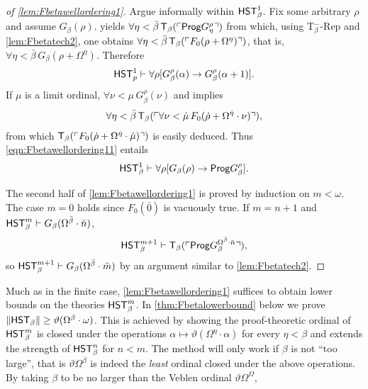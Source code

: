 \documentclass[UKenglish,cleveref,DIV=12]{scrartcl}
\theoremstyle{definition}
\theoremstyle{definition}
\begin{document}
\begin{proof}[of \cref{lem:Fbetawellordering1}]
Argue informally within $\mathsf{HST}_\beta^1$. Fix some arbitrary $\rho$ and assume $G_\beta(\rho)$.
 yields $\forall\eta<\bar\beta\,\mathsf{T}_\beta(\ulcorner{\mathsf{Prog}G_\eta^\rho}\urcorner)$ from which, using T$^-_\beta$-Rep and \cref{lem:Fbetatech2},
one obtains
  $\forall\eta<\bar\beta\,\mathsf{T}_\beta(\ulcorner{F_0(\rho+\Omega^\eta)}\urcorner)$,
that is, $\forall\eta<\bar\beta\,G_\beta(\rho+\Omega^\eta)$. Therefore
\begin{align}\label{eqn:Fbetawellordering11}
 \mathsf{HST}_p^1\vdash\forall\rho[G_\beta^\rho(\alpha)\rightarrow G_\beta^\rho(\alpha+1)].
\end{align}
If $\mu$ is a limit ordinal, $\forall\nu<\mu\,G_\beta^\rho(\nu)$ and
\Uni\beta implies
\begin{align*}
\forall\eta<\bar\beta\,\mathsf{T}_\beta(\ulcorner{\forall\nu<\dot\mu\,F_0(\dot\rho+\Omega^{\dot\eta}
\cdot\nu)}\urcorner),
\end{align*}
from which $\mathsf{T}_\beta(\ulcorner{F_0(\dot\rho+\Omega^{\dot\eta}\cdot\dot\mu)}\urcorner)$ is easily
deduced. Thus \eqref{eqn:Fbetawellordering11} entails
\begin{align*}
 \mathsf{HST}_\beta^1\vdash\forall\rho[G_\beta(\rho)\rightarrow \mathsf{Prog} G_\beta^\rho].
\end{align*}

The second half of \cref{lem:Fbetawellordering1} is proved by induction on $m<\omega$. The case $m=0$ holds since $F_0(\bar0)$ is vacuously true. If $m=n+1$ and $\mathsf{HST}_\beta^m\vdash G_\beta(\Omega^{\bar\beta}\cdot\bar n)$,
\begin{align*}
 \mathsf{HST}_\beta^{m+1}\vdash \mathsf{T}_\beta(\ulcorner{\mathsf{Prog}G_\beta^{\Omega^{\bar\beta}\cdot\bar n}}\urcorner),
\end{align*}
so $\mathsf{HST}_\beta^{m+1}\vdash G_\beta(\Omega^{\bar\beta}\cdot\bar m)$ by an argument similar to \cref{lem:Fbetatech2}.
%
\end{proof}
Much as in the finite case, \cref{lem:Fbetawellordering1} suffices to obtain
lower bounds on the theories $\mathsf{HST}_\beta^m$. In \cref{thm:Fbetalowerbound}
below we prove $\lVert{\mathsf{HST}_\beta}\rVert\ge\vartheta(\Omega^\beta\cdot\omega)$. This is
achieved by showing the proof-theoretic ordinal of $\mathsf{HST}_\beta^m$ is closed under
the operations $\alpha\mapsto\vartheta(\Omega^\eta\cdot\alpha)$ for every
$\eta<\beta$ and extends the strength of $\mathsf{HST}_\beta^n$ for $n<m$. The method will
only work if $\beta$ is not ``too large'', that is $\vartheta\Omega^\beta$ is
indeed the \emph{least} ordinal closed under the above operations. By taking
$\beta$ to be no larger than the Veblen ordinal $\vartheta\Omega^\Omega$,
\end{document}
